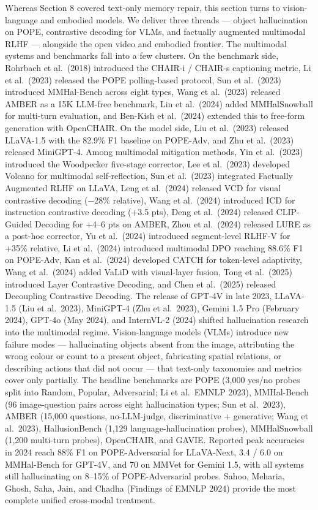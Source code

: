 \documentclass{article}
\begin{document}
Whereas Section 8 covered text-only memory repair, this section turns to vision-language and embodied models. We deliver three threads --- object hallucination on POPE, contrastive decoding for VLMs, and factually augmented multimodal RLHF --- alongside the open video and embodied frontier. The multimodal systems and benchmarks fall into a few clusters. On the benchmark side, Rohrbach et al.~(2018) introduced the CHAIR-i / CHAIR-s captioning metric, Li et al.~(2023) released the POPE polling-based protocol, Sun et al.~(2023) introduced MMHal-Bench across eight types, Wang et al.~(2023) released AMBER as a 15K LLM-free benchmark, Lin et al.~(2024) added MMHalSnowball for multi-turn evaluation, and Ben-Kish et al.~(2024) extended this to free-form generation with OpenCHAIR. On the model side, Liu et al.~(2023) released LLaVA-1.5 with the 82.9\% F1 baseline on POPE-Adv, and Zhu et al.~(2023) released MiniGPT-4. Among multimodal mitigation methods, Yin et al.~(2023) introduced the Woodpecker five-stage corrector, Lee et al.~(2023) developed Volcano for multimodal self-reflection, Sun et al.~(2023) integrated Factually Augmented RLHF on LLaVA, Leng et al.~(2024) released VCD for visual contrastive decoding (−28\% relative), Wang et al.~(2024) introduced ICD for instruction contrastive decoding (+3.5 pts), Deng et al.~(2024) released CLIP-Guided Decoding for +4--6 pts on AMBER, Zhou et al.~(2024) released LURE as a post-hoc corrector, Yu et al.~(2024) introduced segment-level RLHF-V for +35\% relative, Li et al.~(2024) introduced multimodal DPO reaching 88.6\% F1 on POPE-Adv, Kan et al.~(2024) developed CATCH for token-level adaptivity, Wang et al.~(2024) added VaLiD with visual-layer fusion, Tong et al.~(2025) introduced Layer Contrastive Decoding, and Chen et al.~(2025) released Decoupling Contrastive Decoding. The release of GPT-4V in late 2023, LLaVA-1.5 (Liu et al.~2023), MiniGPT-4 (Zhu et al.~2023), Gemini 1.5 Pro (February 2024), GPT-4o (May 2024), and InternVL-2 (2024) shifted hallucination research into the multimodal regime. Vision-language models (VLMs) introduce new failure modes --- hallucinating objects absent from the image, attributing the wrong colour or count to a present object, fabricating spatial relations, or describing actions that did not occur --- that text-only taxonomies and metrics cover only partially. The headline benchmarks are POPE (3,000 yes/no probes split into Random, Popular, Adversarial; Li et al.~EMNLP 2023), MMHal-Bench (96 image-question pairs across eight hallucination types; Sun et al.~2023), AMBER (15,000 questions, no-LLM-judge, discriminative + generative; Wang et al.~2023), HallusionBench (1,129 language-hallucination probes), MMHalSnowball (1,200 multi-turn probes), OpenCHAIR, and GAVIE. Reported peak accuracies in 2024 reach 88\% F1 on POPE-Adversarial for LLaVA-Next, 3.4 / 6.0 on MMHal-Bench for GPT-4V, and 70 on MMVet for Gemini 1.5, with all systems still hallucinating on 8--15\% of POPE-Adversarial probes. Sahoo, Meharia, Ghosh, Saha, Jain, and Chadha (Findings of EMNLP 2024) provide the most complete unified cross-modal treatment.
\end{document}
